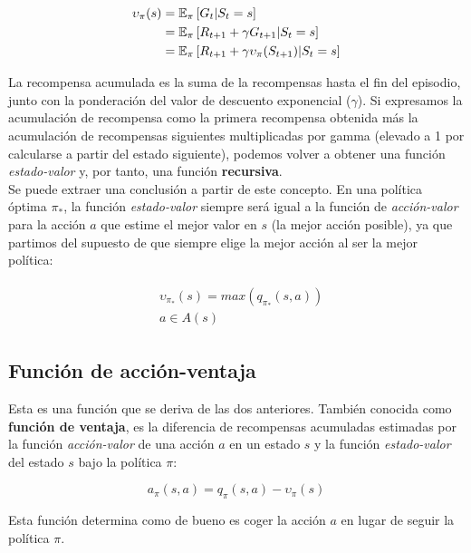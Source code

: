 \documentclass[11pt,fleqn]{book} %
\begin{document}
\begin{align}
\begin{split}
\upsilon_\pi(s)&=\mathbb{E}_\pi\left[G_t|S_t=s\right] \\
&= \mathbb{E}_\pi\left[R_{t+1}+\gamma G_{t+1}|S_t=s\right]\\
&= \mathbb{E}_\pi\left[R_{t+1}+\gamma \upsilon_\pi(S_{t+1})|S_t=s\right]
\end{split}
\end{align} 

La recompensa acumulada es la suma de la recompensas hasta el fin del episodio, junto con la ponderación del valor de descuento exponencial ($\gamma$). Si expresamos la acumulación de recompensa como la primera recompensa obtenida más la acumulación de recompensas siguientes multiplicadas por gamma (elevado a 1 por calcularse a partir del estado siguiente), podemos volver a obtener una función \textit{estado-valor} y, por tanto, una función \textbf{recursiva}.\\

Se puede extraer una conclusión a partir de este concepto. En una política óptima $\pi_*$, la función \textit{estado-valor} siempre será igual a la función de \textit{acción-valor} para la acción $a$ que estime el mejor valor en $s$ (la mejor acción posible), ya que partimos del supuesto de que siempre elige la mejor acción al ser la mejor política:

\begin{align}
\begin{split}
&\upsilon_{\pi_*}(s) = max(q_{\pi_*}(s,a))\\
&a \in A(s)
\end{split}
\end{align} 

\subsection{Función de acción-ventaja}\label{sec:ventaja}

Esta es una función que se deriva de las dos anteriores. También conocida como \textbf{función de ventaja}, es la diferencia de recompensas acumuladas estimadas por la función \textit{acción-valor} de una acción $a$ en un estado $s$ y la función \textit{estado-valor} del estado $s$ bajo la política $\pi$:

\begin{equation}
a_\pi(s,a)=q_\pi(s,a)-\upsilon_\pi(s)
\end{equation}

Esta función determina como de bueno es coger la acción $a$ en lugar de seguir la política $\pi$.
\end{document}
